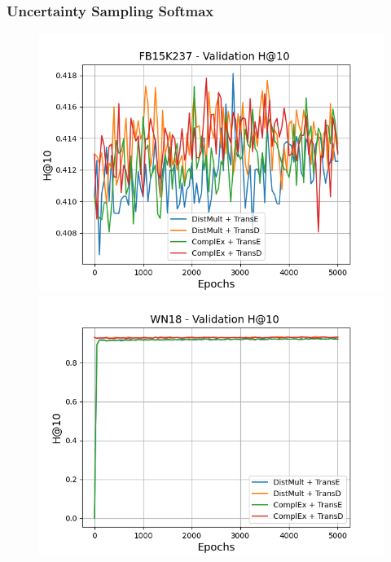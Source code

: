 \subsubsection{Uncertainty Sampling Softmax}

\begin{figure}
    \centering
    \begin{minipage}{.3\textwidth}
      \centering
      \includegraphics[width=\linewidth]{figures/results/gan_train/pretrained/uncertainty/max_distribution/entropy/fb15k237/5k_epochs/uncertainty_fb15k237_hit10.png}
    \end{minipage}%
    \begin{minipage}{.3\textwidth}
      \centering
      \includegraphics[width=\linewidth]{figures/results/gan_train/pretrained/uncertainty/max_distribution/entropy/wn18/5k_epochs/uncertainty_wn18_hit10.png}

\end{minipage}
\end{figure}
